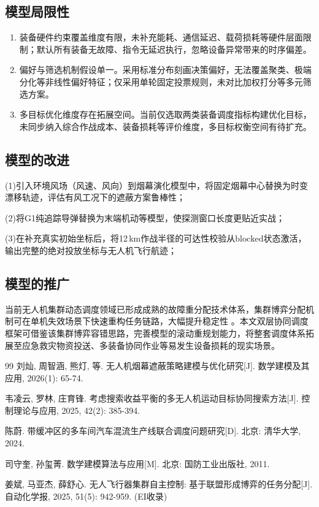 \documentclass[withoutpreface,bwprint]{cumcmthesis}
\begin{document}
\subsection{模型局限性}
\begin{enumerate}
	\item 装备硬件约束覆盖维度有限，未补充能耗、通信延迟、载荷损耗等硬件层面限制；默认所有装备无故障、指令无延迟执行，忽略设备异常带来的时序偏差。
	\item 偏好与筛选机制假设单一。采用标准分布刻画决策偏好，无法覆盖聚类、极端分化等非线性偏好特征；仅采用单轮固定投票规则，未对比加权打分等多元筛选方案。
	\item 多目标优化维度存在拓展空间。当前仅选取两类装备调度指标构建优化目标，未同步纳入综合作战成本、装备损耗等评价维度，多目标权衡空间有待扩充。
\end{enumerate}

\subsection{模型的改进}

(1)引入环境风场（风速、风向）到烟幕演化模型中，将固定烟幕中心替换为时变漂移轨迹，评估有风工况下的遮蔽方案鲁棒性；

(2)将G1纯追踪导弹替换为末端机动等模型，使探测窗口长度更贴近实战；

(3)在补充真实初始坐标后，将12\,km作战半径的可达性校验从$\text{blocked}$状态激活，输出完整的绝对投放坐标与无人机飞行航迹；

\subsection{模型的推广}

当前无人机集群动态调度领域已形成成熟的故障重分配技术体系，集群博弈分配机制可在单机失效场景下快速重构任务链路，大幅提升稳定性 \cite {jiang2025uavgame}。本文双层协同调度框架可借鉴该集群博弈容错思路，完善模型的滚动重规划能力，将整套调度体系拓展至应急救灾物资投送、多装备协同作业等易发生设备损耗的现实场景。

\begin{thebibliography}{99}
	刘灿, 周智涵, 熊灯, 等. 无人机烟幕遮蔽策略建模与优化研究[J]. 数学建模及其应用, 2026(1): 65-74.
	
	韦凌云, 罗林, 庄育锋. 考虑搜索收益平衡的多无人机运动目标协同搜索方法[J]. 控制理论与应用, 2025, 42(2): 385-394.
	
	陈蔚. 带缓冲区的多车间汽车混流生产线联合调度问题研究[D]. 北京: 清华大学, 2024.
	
	司守奎, 孙玺菁. 数学建模算法与应用[M]. 北京: 国防工业出版社, 2011.
	
	姜斌, 马亚杰, 薛舒心. 无人飞行器集群自主控制: 基于联盟形成博弈的任务分配[J]. 自动化学报, 2025, 51(5): 942-959. (EI收录)
\end{thebibliography}
\end{document}
